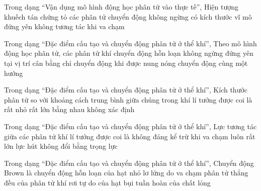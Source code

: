 \begin{ex}
Trong dạng “Vận dụng mô hình động học phân tử vào thực tế”, Hiện tượng khuếch tán chứng tỏ các phân tử
\choice
{\True chuyển động không ngừng}
{có kích thước vĩ mô}
{đứng yên}
{không tương tác khi va chạm}
\end{ex}

\begin{ex}
Trong dạng “Đặc điểm cấu tạo và chuyển động phân tử ở thể khí”, Theo mô hình động học phân tử, các phân tử khí
\choice
{\True chuyển động hỗn loạn không ngừng}
{đứng yên tại vị trí cân bằng}
{chỉ chuyển động khi được nung nóng}
{chuyển động cùng một hướng}
\end{ex}

\begin{ex}
Trong dạng “Đặc điểm cấu tạo và chuyển động phân tử ở thể khí”, Kích thước phân tử so với khoảng cách trung bình giữa chúng trong khí lí tưởng được coi là
\choice
{\True rất nhỏ}
{rất lớn}
{bằng nhau}
{không xác định}
\end{ex}

\begin{ex}
Trong dạng “Đặc điểm cấu tạo và chuyển động phân tử ở thể khí”, Lực tương tác giữa các phân tử khí lí tưởng được coi là
\choice
{\True không đáng kể trừ khi va chạm}
{luôn rất lớn}
{lực hút không đổi}
{bằng trọng lực}
\end{ex}

\begin{ex}
Trong dạng “Đặc điểm cấu tạo và chuyển động phân tử ở thể khí”, Chuyển động Brown là chuyển động
\choice
{\True hỗn loạn của hạt nhỏ lơ lửng do va chạm phân tử}
{thẳng đều của phân tử khí}
{rơi tự do của hạt bụi}
{tuần hoàn của chất lỏng}
\end{ex}

